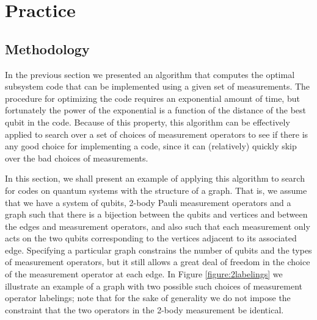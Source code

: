 \documentclass{amsbook}
\theoremstyle{plain}
\theoremstyle{definition}
\theoremstyle{remark}
\begin{document}
\chapter{Practice} \label{sec:lattice}
\section{Methodology} \label{sec:methodology}

In the previous section we presented an algorithm that computes the optimal subsystem code that can be implemented using a given set of measurements.  The procedure for optimizing the code requires an exponential amount of time, but fortunately the power of the exponential is a function of the distance of the best qubit in the code.   Because of this property, this algorithm can be effectively applied to search over a set of choices of measurement operators to see if there is any good choice for implementing a code, since it can (relatively) quickly skip over the bad choices of measurements.

In this section, we shall present an example of applying this algorithm to search for codes on quantum systems with the structure of a graph.  That is, we assume that we have a system of qubits, 2-body Pauli measurement operators and a graph such that there is a bijection between the qubits and vertices and between the edges and measurement operators, and also such that each measurement only acts on the two qubits corresponding to the vertices adjacent to its associated edge.  Specifying a particular graph constrains the number of qubits and the types of measurement operators, but it still allows a great deal of freedom in the choice of the measurement operator at each edge.  In Figure \ref{figure:2labelings} we illustrate an example of a graph with two possible such choices of measurement operator labelings;  note that for the sake of generality we do not impose the constraint that the two operators in the 2-body measurement be identical.
\end{document}
